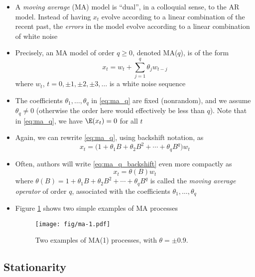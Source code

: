 \documentclass{article}
\begin{document}
\begin{itemize}
\item A \emph{moving average} (MA) model is ``dual'', in a colloquial sense, to
  the AR model. Instead of having $x_t$ evolve according to a linear combination
  of the recent past, the \emph{errors} in the model evolve according to a
  linear combination of white noise

\item Precisely, an MA model of order $q \geq 0$, denoted MA($q$), is of the
  form 
  \begin{equation}
  \label{eq:ma_q}
  x_t = w_t + \sum_{j=1}^q \theta_j w_{t-j} 
  \end{equation}
  where $w_t$, $t = 0, \pm 1, \pm 2, \pm 3, \dots$ is a white noise
  sequence

\item The coefficients $\theta_1,\dots,\theta_q$ in \eqref{eq:ma_q} are fixed
  (nonrandom), and we assume $\theta_q \not= 0$ (otherwise the order here would 
  effectively be less than $q$). Note that in \eqref{eq:ma_q}, we have $\E(x_t)
  = 0$ for all $t$ 

\item Again, we can rewrite \eqref{eq:ma_q}, using backshift notation, as 
  \begin{equation}
  \label{eq:ma_q_backshift}
  x_t = \Big(1 + \theta_1 B + \theta_2 B^2 + \cdots + \theta_q B^q \Big) w_t   
  \end{equation}

\item Often, authors will write \eqref{eq:ma_q_backshift} even more compactly as   
  \begin{equation}
  \label{eq:ma_q_operator}
  x_t = \theta(B) w_t 
  \end{equation}
  where $\theta(B) = 1 + \theta_1 B + \theta_2 B^2 + \cdots + \theta_q B^q$ is
  called the \emph{moving average operator} of order $q$, associated with the
  coefficients $\theta_1,\dots,\theta_q$

\item Figure \ref{fig:ma} shows two simple examples of MA processes

\begin{figure}[htb]
\centering
\texttt{[image: fig/ma-1.pdf]}
\caption{Two examples of MA(1) processes, with $\theta = \pm 0.9$.}
\label{fig:ma}
\end{figure}
\end{itemize}

\subsection{Stationarity}
\end{document}
